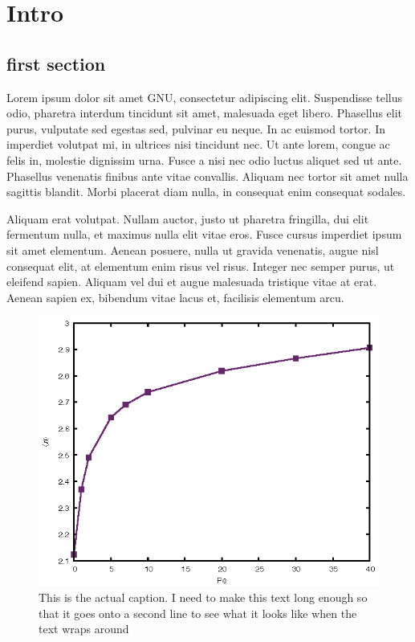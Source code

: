 \chapter{Intro}
\label{chapter:intro}

\section{first section}
Lorem ipsum dolor sit amet \gls{GNU}, consectetur adipiscing elit. Suspendisse tellus odio, pharetra interdum tincidunt sit amet, malesuada eget libero. Phasellus elit purus, vulputate sed egestas sed, pulvinar eu neque. In ac euismod tortor. In imperdiet volutpat mi, in ultrices nisi tincidunt nec. Ut ante lorem, congue ac felis in, molestie dignissim urna. Fusce a nisi nec odio luctus aliquet sed ut ante. Phasellus venenatis finibus ante vitae convallis. Aliquam nec tortor sit amet nulla sagittis blandit. Morbi placerat diam nulla, in consequat enim consequat sodales.

Aliquam erat volutpat. Nullam auctor, justo ut pharetra fringilla, dui elit fermentum nulla, et maximus nulla elit vitae eros. Fusce cursus imperdiet ipsum sit amet elementum. Aenean posuere, nulla ut gravida venenatis, augue nisl consequat elit, at elementum enim risus vel risus. Integer nec semper purus, ut eleifend sapien. Aliquam vel dui et augue malesuada tristique vitae at erat. Aenean sapien ex, bibendum vitae lacus et, facilisis elementum arcu.


\begin{figure}[h]
	\includegraphics[width=0.8\linewidth]{figs/test.eps}
	\caption[Caption for the list of figures]{This is the actual caption. I need to make this text long enough so that it goes onto a second line to see what it looks like when the text wraps around}
	\label{fig:intro:test}
\end{figure}

